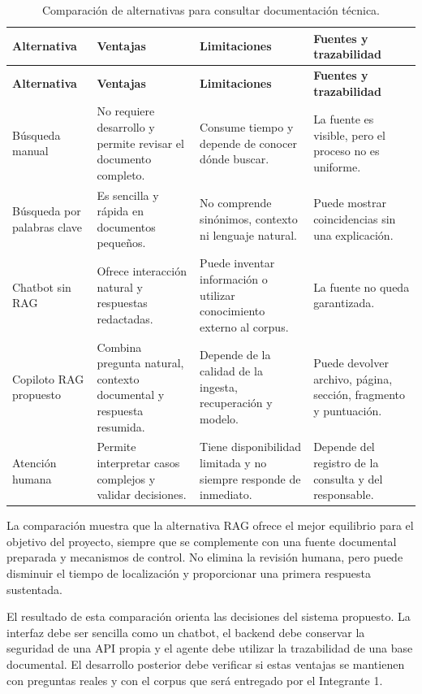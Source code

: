 \renewcommand{\arraystretch}{1.35}
\begin{longtable}{p{3.3cm}p{3.4cm}p{3.4cm}p{3.5cm}}
\caption{Comparación de alternativas para consultar documentación técnica.}\label{tab:comparativa}\\\toprule
\textbf{Alternativa} & \textbf{Ventajas} & \textbf{Limitaciones} & \textbf{Fuentes y trazabilidad}\\\midrule
\endfirsthead
\toprule\textbf{Alternativa} & \textbf{Ventajas} & \textbf{Limitaciones} & \textbf{Fuentes y trazabilidad}\\\midrule
\endhead
\bottomrule\endfoot
Búsqueda manual & No requiere desarrollo y permite revisar el documento completo. & Consume tiempo y depende de conocer dónde buscar. & La fuente es visible, pero el proceso no es uniforme.\\
Búsqueda por palabras clave & Es sencilla y rápida en documentos pequeños. & No comprende sinónimos, contexto ni lenguaje natural. & Puede mostrar coincidencias sin una explicación.\\
Chatbot sin RAG & Ofrece interacción natural y respuestas redactadas. & Puede inventar información o utilizar conocimiento externo al corpus. & La fuente no queda garantizada.\\
Copiloto RAG propuesto & Combina pregunta natural, contexto documental y respuesta resumida. & Depende de la calidad de la ingesta, recuperación y modelo. & Puede devolver archivo, página, sección, fragmento y puntuación.\\
Atención humana & Permite interpretar casos complejos y validar decisiones. & Tiene disponibilidad limitada y no siempre responde de inmediato. & Depende del registro de la consulta y del responsable.\\
\end{longtable}

La comparación muestra que la alternativa RAG ofrece el mejor equilibrio para el objetivo del proyecto, siempre que se complemente con una fuente documental preparada y mecanismos de control. No elimina la revisión humana, pero puede disminuir el tiempo de localización y proporcionar una primera respuesta sustentada.

El resultado de esta comparación orienta las decisiones del sistema propuesto. La interfaz debe ser sencilla como un chatbot, el backend debe conservar la seguridad de una API propia y el agente debe utilizar la trazabilidad de una base documental. El desarrollo posterior debe verificar si estas ventajas se mantienen con preguntas reales y con el corpus que será entregado por el Integrante 1.
